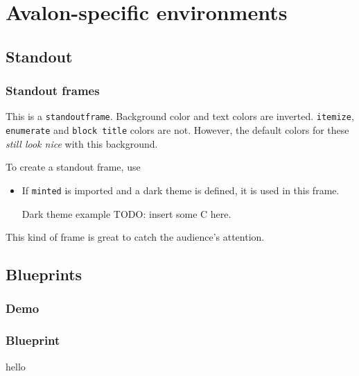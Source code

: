 \documentclass[aspectratio=169]{beamer}
\begin{document}
\makeatletter
\makeatother
\section{Avalon-specific environments}
\subsection{Standout}
\begin{frame}[standout]
  \frametitle{Standout frames}
  This is a \texttt{standoutframe}. Background color and text colors are inverted.
  \texttt{itemize}, \texttt{enumerate} and \texttt{block title} colors are not.
  However, the default colors for these \emph{still look nice} with this background.

  \begin{block}{}
    To create a standout frame, use
  \end{block}

  \begin{itemize}
  \item If \texttt{minted} is imported and a dark theme is defined, it is used in this
    frame.
    \begin{exampleblock}{Dark theme example}
      TODO: insert some C here.
    \end{exampleblock}
  \end{itemize}

  This kind of frame is great to catch the audience's attention.

\end{frame}



\subsection{Blueprints}
\subsubsection{Demo}
\begin{blueprintframe}
  \frametitle{Blueprint}
  hello
\end{blueprintframe}
\end{document}
